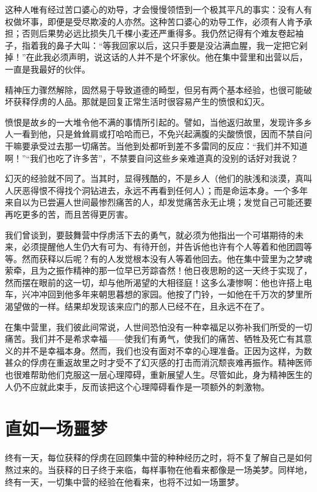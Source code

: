 \documentclass[11pt,oneside]{book}
\begin{document}
\begin{common-format}
这种人唯有经过苦口婆心的劝导，才会慢慢领悟到一个极其平凡的事实：没有人有权做坏事，即便是受尽欺凌的人亦然。这种苦口婆心的劝导工作，必须有人肯予承担；否则后果势必远比损失几千棵小麦还严重得多。我仍然记得有个难友卷起袖子，指着我的鼻子大叫：“等我回家以后，这只手要是没沾满血腥，我一定把它剁掉！”在此我必须声明，说这话的人并不是个坏家伙。他在集中营里和出营以后，一直是我最好的伙伴。

精神压力骤然解除，固然易于导致道德的畸型，但另有两个基本经验，也很可能破坏获释俘虏的人品。那就是回复正常生活时很容易产生的愤恨和幻灭。

愤恨是故乡的一大堆令他不满的事情所引起的。譬如，当他返归故里，发现许多乡人一看到他，只是耸耸肩或打哈哈而已，不免兴起满腹的尖酸愤恨，因而不禁自问干嘛要承受过去那一切痛苦。当他到处都听到差不多雷同的反应：“我们并不知道啊！”“我们也吃了许多苦”，不禁要自问这些乡亲难道真的没别的话好对我说？

幻灭的经验就不同了。当其时，显得残酷的，不是乡人（他们的肤浅和淡漠，真叫人厌恶得恨不得找个洞钻进去，永远不再看到任何人）；而是命运本身。一个多年来自以为已尝遍人世间最惨烈痛苦的人，却发觉痛苦永无止境；发觉自己可能还要再吃更多的苦，而且苦得更厉害。

我们曾谈到，要鼓舞营中俘虏活下去的勇气，就必须为他指出一个可堪期待的未来，必须提醒他人生仍大有可为、有待开创，并告诉他也许有个人等着和他团圆等等。然而获释以后呢？有的人发觉根本没有人等着他回去。他在集中营里为之梦魂萦牵，且为之振作精神的那一位早已芳踪杳然！他日夜思盼的这一天终于实现了，然而摆在眼前的这一切，却与他所渴望的大相径庭！这多么凄惨啊：他也许搭上电车，兴冲冲回到他多年来朝思暮想的家园。他按了门铃，一如他在千万次的梦里所渴望做的一样。结果却发现该来应门的那人已经不在，且永远不在了。

在集中营里，我们彼此间常说，人世间恐怕没有一种幸福足以弥补我们所受的一切痛苦。我们并不是希求幸福——使我们有勇气，使我们的痛苦、牺牲及死亡有其意义的并不是幸福本身。然而，我们也没有面对不幸的心理准备。正因为这样，为数甚众的俘虏在重返故里之时才受不了幻灭感的打击而消沉颓丧难再振作。精神医师也很难帮助他们克服这一层心理障碍，重新展望人生。尽管如此，身为精神医生的人仍不应就此束手，反而该把这个心理障碍看作是一项额外的刺激物。


\section{直如一场噩梦}
终有一天，每位获释的俘虏在回顾集中营的种种经历之时，将不复了解自己是如何熬过来的。当获释的日子终于来临，每样事物在他看来都像是一场美梦。同样地，终有一天，一切集中营的经验在他看来，也将不过如一场噩梦。


\end{common-format}
\end{document}
